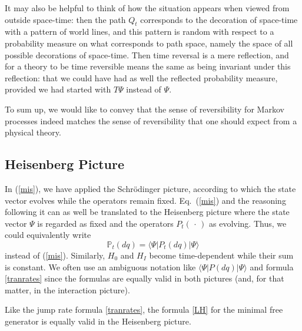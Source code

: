 \documentclass[12pt]{article}
\newcommand{\1}{\mathbf{1}} %
\renewcommand{\sp}[2]{\langle #1 | #2 \rangle} %
\newcommand{\measure}{\mathbb{P}} %
\newcommand{\pov}{{P}}%
\newcommand{\inter}{{I}} %
\begin{document}
   It may also be helpful to think of how the situation appears when
   viewed from outside space-time: then the path $Q_t$ corresponds to
   the decoration of space-time with a pattern of world lines, and this
   pattern is random with respect to a probability measure on what
   corresponds to path space, namely the space of all possible
   decorations of space-time. Then time reversal is a mere reflection,
   and for a theory to be time reversible means the same as being
   invariant under this reflection: that we could have had as well the
   reflected probability measure, provided we had started with $T\Psi$
   instead of $\Psi$.

   To sum up, we would like to convey that the sense of reversibility
   for Markov processes indeed matches the sense of reversibility that
   one should expect from a physical theory.

\subsection{Heisenberg Picture}

   In (\ref{mis}), we have applied the Schr\"odinger picture, according
   to which the state vector evolves while the operators remain
   fixed. Eq.~(\ref{mis}) and the reasoning following it can as well be
   translated to the Heisenberg picture where the state vector $\Psi$
   is regarded as fixed and the operators $\pov_t(\,\cdot\,)$ as
   evolving. Thus, we could equivalently write
   \[
     \measure_t(dq) = \sp{\Psi}{\pov_t(dq)| \Psi}
   \]
   instead of (\ref{mis}). Similarly, $H_0$ and $H_\inter$ become
   time-dependent while their sum is constant.  We often use an
   ambiguous notation like $\sp{\Psi}{\pov(dq)|\Psi}$ and formula
   \eqref{tranrates} since the formulas are equally valid in both
   pictures (and, for that matter, in the interaction picture).

   Like the jump rate formula \eqref{tranrates}, the formula \eqref{LH}
   for the minimal free generator is equally valid in the Heisenberg
   picture.
\end{document}
